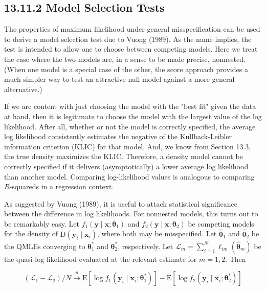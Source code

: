 \documentclass[10pt]{article}
\begin{document}
\subsection*{13.11.2 Model Selection Tests}
The properties of maximum likelihood under general misspecification can be used to derive a model selection test due to Vuong (1989). As the name implies, the test is intended to allow one to choose between competing models. Here we treat the case where the two models are, in a sense to be made precise, nonnested. (When one model is a special case of the other, the score approach provides a much simpler way to test an attractive null model against a more general alternative.)

If we are content with just choosing the model with the "best fit" given the data at hand, then it is legitimate to choose the model with the largest value of the log likelihood. After all, whether or not the model is correctly specified, the average log likelihood consistently estimates the negative of the Kullback-Leibler information criterion (KLIC) for that model. And, we know from Section 13.3, the true density maximizes the KLIC. Therefore, a density model cannot be correctly specified if it delivers (asymptotically) a lower average log likelihood than another model. Comparing log-likelihood values is analogous to comparing $R$-squareds in a regression context.

As suggested by Vuong (1989), it is useful to attach statistical significance between the difference in log likelihoods. For nonnested models, this turns out to be remarkably easy. Let $f_{1}\left(\mathbf{y} \mid \mathbf{x} ; \boldsymbol{\theta}_{1}\right)$ and $f_{2}\left(\mathbf{y} \mid \mathbf{x} ; \boldsymbol{\theta}_{2}\right)$ be competing models for the density of $\mathrm{D}\left(\mathbf{y}_{i} \mid \mathbf{x}_{i}\right)$, where both may be misspecified. Let $\hat{\boldsymbol{\theta}}_{1}$ and $\hat{\boldsymbol{\theta}}_{2}$ be the QMLEs converging to $\boldsymbol{\theta}_{1}^{*}$ and $\boldsymbol{\theta}_{2}^{*}$, respectively. Let $\mathscr{L}_{m}=\sum_{i=1}^{N} \ell_{i m}\left(\hat{\boldsymbol{\theta}}_{m}\right)$ be the quasi-log likelihood evaluated at the relevant estimate for $m=1,2$. Then

$$
\left(\mathscr{L}_{1}-\mathscr{L}_{2}\right) / N \xrightarrow{p} \mathrm{E}\left[\log f_{1}\left(\mathbf{y}_{i} \mid \mathbf{x}_{i} ; \boldsymbol{\theta}_{1}^{*}\right)\right]-\mathrm{E}\left[\log f_{2}\left(\mathbf{y}_{i} \mid \mathbf{x}_{i} ; \boldsymbol{\theta}_{2}^{*}\right)\right]
$$
\end{document}

